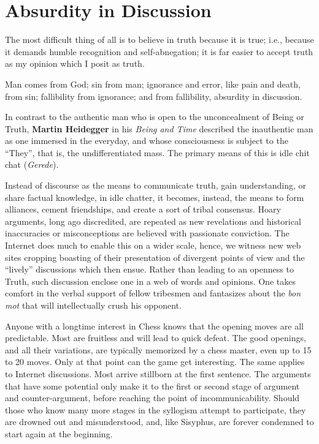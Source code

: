 \section{Absurdity in Discussion}

\begin{quotex}
The most difficult thing of all is to believe in truth because it is true; i.e., because it demands humble recognition and self-abnegation; it is far easier to accept truth as my opinion which I posit as truth.

Man comes from God; sin from man; ignorance and error, like pain and death, from sin; fallibility from ignorance; and from fallibility, absurdity in discussion.
\end{quotex}


In contrast to the authentic man who is open to the unconcealment of Being or Truth, \textbf{Martin Heidegger} in his \emph{Being and Time} described the inauthentic man as one immersed in the everyday, and whose consciousness is subject to the ``They'', that is, the undifferentiated mass. The primary means of this is idle chit chat (\emph{Gerede}).

Instead of discourse as the means to communicate truth, gain understanding, or share factual knowledge, in idle chatter, it becomes, instead, the means to form alliances, cement friendships, and create a sort of tribal consensus. Hoary arguments, long ago discredited, are repeated as new revelations and historical inaccuracies or misconceptions are believed with passionate conviction. The Internet does much to enable this on a wider scale, hence, we witness new web sites cropping boasting of their presentation of divergent points of view and the ``lively'' discussions which then ensue. Rather than leading to an openness to Truth, such discussion enclose one in a web of words and opinions. One takes comfort in the verbal support of fellow tribesmen and fantasizes about the \emph{bon mot} that will intellectually crush his opponent.

Anyone with a longtime interest in Chess knows that the opening moves are all predictable. Most are fruitless and will lead to quick defeat. The good openings, and all their variations, are typically memorized by a chess master, even up to 15 to 20 moves. Only at that point can the game get interesting. The same applies to Internet discussions. Most arrive stillborn at the first sentence. The arguments that have some potential only make it to the first or second stage of argument and counter-argument, before reaching the point of incommunicability. Should those who know many more stages in the syllogism attempt to participate, they are drowned out and misunderstood, and, like Sisyphus, are forever condemned to start again at the beginning.

